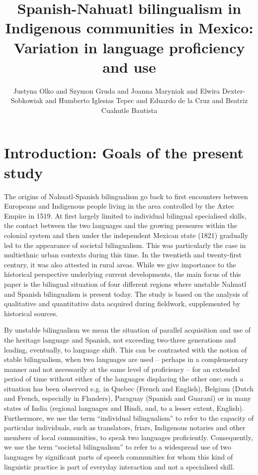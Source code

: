 \documentclass[output=paper,hidelinks]{langscibook}
\author{Justyna Olko\affiliation{University of Warsaw} and Szymon Gruda\affiliation{University of Warsaw} and Joanna Maryniak\affiliation{University of Warsaw} and Elwira Dexter-Sobkowiak\affiliation{University of Warsaw} and Humberto Iglesias Tepec\affiliation{Instituto de Educación Media Superior de la Ciudad de México} and Eduardo de la Cruz\affiliation{University of Warsaw; Instituto de Docencia e Investigación Etnológica de Zacatecas} and Beatriz Cuahutle Bautista}
\title{Spanish-Nahuatl bilingualism in Indigenous communities in Mexico: Variation in language proficiency and use}
\begin{document}
\maketitle

\section{Introduction: Goals of the present study}

The origins of Nahuatl-Spanish bilingualism go back to first encounters between Europeans and Indigenous people living in the area controlled by the Aztec Empire in 1519. At first largely limited to individual bilingual specialised skills, the contact between the two languages and the growing pressures within the colonial system and then under the independent Mexican state (1821) gradually led to the appearance of societal bilingualism. This was particularly the case in multiethnic urban contexts during this time. In the twentieth and twenty-first century, it was also attested in rural areas. While we give importance to the historical perspective underlying current developments, the main focus of this paper is the bilingual situation of four different regions where unstable Nahuatl and Spanish bilingualism is present today. The study is based on the analysis of qualitative and quantitative data acquired during fieldwork, supplemented by historical sources.

By unstable bilingualism we mean the situation of parallel acquisition and use of the heritage language and Spanish, not exceeding two-three generations and leading, eventually, to language shift. This can be contrasted with the notion of stable bilingualism, when two languages are used – perhaps in a complementary manner and not necessarily at the same level of proficiency – for an extended period of time without either of the languages displacing the other one; such a situation has been observed e.g. in Quebec (French and English), Belgium (Dutch and French, especially in Flanders), Paraguay (Spanish and Guaraní) or in many states of India (regional languages and Hindi, and, to a lesser extent, English). Furthermore, we use the term ``individual bilingualism'' to refer to the capacity of particular individuals, such as translators, friars, Indigenous notaries and other members of local communities, to speak two languages proficiently. Consequently, we use the term ``societal bilingualism'' to refer to a widespread use of two languages by significant parts of speech communities for whom this kind of linguistic practice is part of everyday interaction and not a specialised skill.
\end{document}
